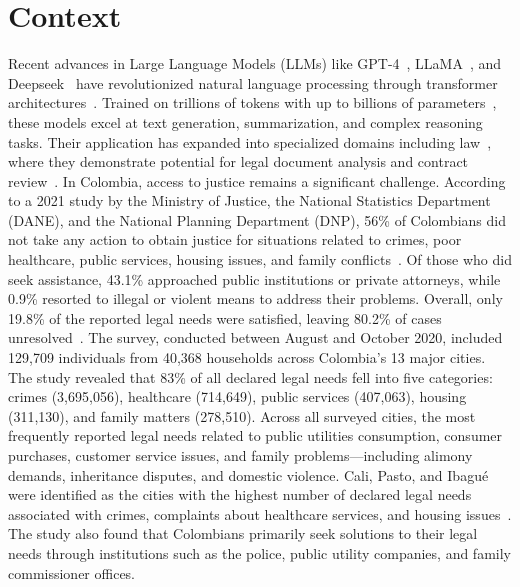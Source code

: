 \section{Context}
Recent advances in Large Language Models (LLMs) like GPT-4~\cite{openai2023},
LLaMA~\cite{grattafiori2024llama3herdmodels}, and 
Deepseek~\cite{deepseekai2025deepseekr1incentivizingreasoningcapability} have revolutionized natural
language processing through transformer architectures~\cite{vaswani2023attentionneed}.
Trained on trillions of tokens with up to billions of parameters~\cite{brown2020},
these models excel at text generation, summarization, and complex reasoning tasks.
Their application has expanded into specialized domains including law~\cite{nay2023},
where they demonstrate potential for legal document analysis and
contract review~\cite{chalkidis2022}.
In Colombia, access to justice remains a significant challenge. 
According to a 2021 study by the Ministry of Justice, the National Statistics Department (DANE),
and the National Planning Department (DNP), 56\% of Colombians did not take any action 
to obtain justice for situations related to crimes, poor healthcare, public services, 
housing issues, and family conflicts~\cite{dnp2021}. 
Of those who did seek assistance, 43.1\% approached public institutions or private attorneys,
while 0.9\% resorted to illegal or violent means to address their problems. Overall, 
only 19.8\% of the reported legal needs were satisfied, 
leaving 80.2\% of cases unresolved~\cite{dnp2021}.
The survey, conducted between August and October 2020, included 129,709 individuals from 40,368 
households across Colombia's 13 major cities. 
The study revealed that 83\% of all declared legal needs fell into five categories: 
crimes (3,695,056), healthcare (714,649), public services (407,063), housing (311,130), and family matters (278,510). 
Across all surveyed cities, the most frequently reported legal needs related to public utilities consumption, 
consumer purchases, customer service issues, and family problems—including alimony demands, 
inheritance disputes, and domestic violence. Cali, Pasto, and Ibagué were identified as the cities with the highest number 
of declared legal needs associated with crimes, complaints about healthcare services, and housing issues~\cite{dnp2021}.
The study also found that Colombians primarily seek solutions to their legal needs through institutions such as the police, 
public utility companies, and family commissioner offices.
